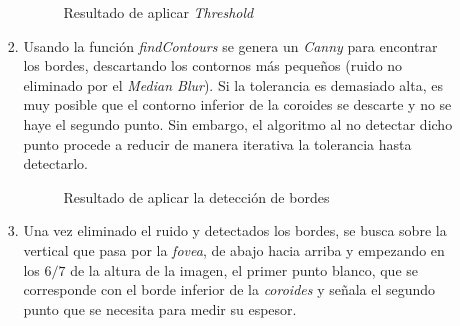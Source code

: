 \begin{enumerate}
\begin{enumerate}[label*=\arabic*.]
\begin{enumerate}[label*=\arabic*.]
      \begin{figure}[H]
        \caption{Resultado de aplicar \emph{Threshold}}
        \centering \setlength\fboxsep{0pt} \setlength\fboxrule{0.5pt}
      \end{figure}

    \item Usando la función
      \emph{findContours} se genera un
      \emph{Canny} para encontrar los
      bordes, descartando los contornos más pequeños (ruido no
      eliminado por el \emph{Median Blur}). Si la tolerancia es
      demasiado alta, es muy posible que el contorno inferior de la
      \gls{coroides} se descarte y no se haye el segundo punto. Sin
      embargo, el algoritmo al no detectar dicho punto procede a
      reducir de manera iterativa la tolerancia hasta detectarlo.

      \begin{figure}[H]
        \caption{Resultado de aplicar la detección de bordes}
        \centering \setlength\fboxsep{0pt} \setlength\fboxrule{0.5pt}
      \end{figure}

    \item Una vez eliminado el ruido y detectados los bordes, se busca
      sobre la vertical que pasa por la \emph{\gls{fovea}}, de abajo
      hacia arriba y empezando en los $6/7$ de la altura de la imagen,
      el primer punto blanco, que se corresponde con el borde inferior
      de la \emph{\gls{coroides}} y señala el segundo punto que se
      necesita para medir su espesor.


\end{enumerate}
\end{enumerate}
\end{enumerate}
